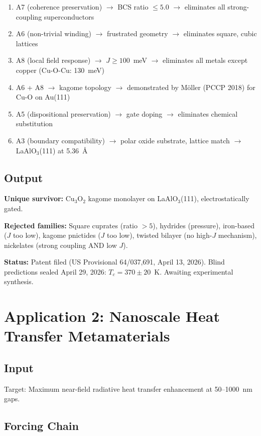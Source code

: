 \documentclass[11pt, a4paper]{article}
\begin{document}
\begin{enumerate}
  \item A7 (coherence preservation) $\to$ BCS ratio $\leq 5.0$
    $\to$ eliminates all strong-coupling superconductors
  \item A6 (non-trivial winding) $\to$ frustrated geometry
    $\to$ eliminates square, cubic lattices
  \item A8 (local field response) $\to$ $J \geq 100$~meV
    $\to$ eliminates all metals except copper (Cu-O-Cu:
    130~meV)
  \item A6 + A8 $\to$ kagome topology $\to$ demonstrated by
    M\"oller (PCCP 2018) for Cu-O on Au(111)
  \item A5 (dispositional preservation) $\to$ gate doping
    $\to$ eliminates chemical substitution
  \item A3 (boundary compatibility) $\to$ polar oxide
    substrate, lattice match $\to$ LaAlO$_3$(111) at
    5.36~\AA
\end{enumerate}

\subsection{Output}

\textbf{Unique survivor:} Cu$_3$O$_2$ kagome monolayer on
LaAlO$_3$(111), electrostatically gated.

\textbf{Rejected families:} Square cuprates (ratio $>5$),
hydrides (pressure), iron-based ($J$ too low), kagome
pnictides ($J$ too low), twisted bilayer (no high-$J$
mechanism), nickelates (strong coupling AND low $J$).

\textbf{Status:} Patent filed (US Provisional 64/037,691,
April 13, 2026). Blind predictions sealed April 29, 2026:
$T_c = 370 \pm 20$~K. Awaiting experimental synthesis.

\section{Application 2: Nanoscale Heat Transfer Metamaterials}

\subsection{Input}

Target: Maximum near-field radiative heat transfer enhancement
at 50--1000~nm gaps.

\subsection{Forcing Chain}
\end{document}
